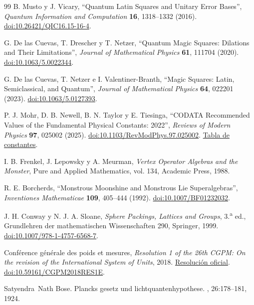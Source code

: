 \begin{thebibliography}{99}
 B. Musto y J. Vicary, ``Quantum Latin Squares and Unitary Error Bases'', \emph{Quantum Information and Computation} \textbf{16}, 1318--1332 (2016). \href{https://doi.org/10.26421/QIC16.15-16-4}{doi:10.26421/QIC16.15-16-4}.

 G. De las Cuevas, T. Drescher y T. Netzer, ``Quantum Magic Squares: Dilations and Their Limitations'', \emph{Journal of Mathematical Physics} \textbf{61}, 111704 (2020). \href{https://doi.org/10.1063/5.0022344}{doi:10.1063/5.0022344}.

 G. De las Cuevas, T. Netzer e I. Valentiner-Branth, ``Magic Squares: Latin, Semiclassical, and Quantum'', \emph{Journal of Mathematical Physics} \textbf{64}, 022201 (2023). \href{https://doi.org/10.1063/5.0127393}{doi:10.1063/5.0127393}.

 P. J. Mohr, D. B. Newell, B. N. Taylor y E. Tiesinga, ``CODATA Recommended Values of the Fundamental Physical Constants: 2022'', \emph{Reviews of Modern Physics} \textbf{97}, 025002 (2025). \href{https://doi.org/10.1103/RevModPhys.97.025002}{doi:10.1103/RevModPhys.97.025002}. \href{https://physics.nist.gov/cuu/Constants/Table/allascii.txt}{Tabla de constantes}.

 I. B. Frenkel, J. Lepowsky y A. Meurman, \emph{Vertex Operator Algebras and the Monster}, Pure and Applied Mathematics, vol. 134, Academic Press, 1988.

 R. E. Borcherds, ``Monstrous Moonshine and Monstrous Lie Superalgebras'', \emph{Inventiones Mathematicae} \textbf{109}, 405--444 (1992). \href{https://doi.org/10.1007/BF01232032}{doi:10.1007/BF01232032}.

 J. H. Conway y N. J. A. Sloane, \emph{Sphere Packings, Lattices and Groups}, 3.\textsuperscript{a} ed., Grundlehren der mathematischen Wissenschaften 290, Springer, 1999. \href{https://doi.org/10.1007/978-1-4757-6568-7}{doi:10.1007/978-1-4757-6568-7}.

 Conférence générale des poids et mesures, \emph{Resolution 1 of the 26th CGPM: On the revision of the International System of Units}, 2018. \href{https://www.bipm.org/en/committees/cg/cgpm/26-2018/resolution-1}{Resolución oficial}. \href{https://doi.org/10.59161/CGPM2018RES1E}{doi:10.59161/CGPM2018RES1E}.

 Satyendra~Nath Bose.
\newblock Plancks gesetz und lichtquantenhypothese.
, 26:178--181, 1924.


\end{thebibliography}
